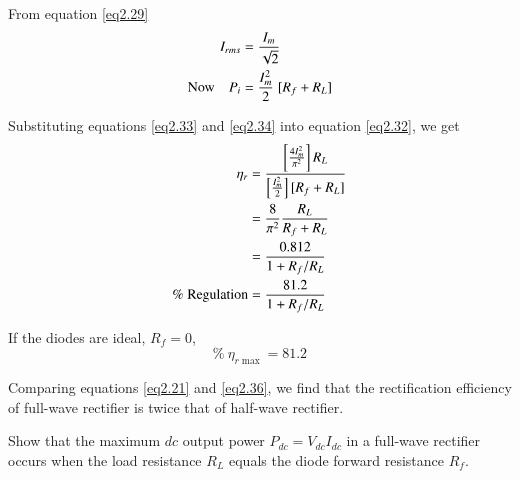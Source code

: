 From equation \eqref{eq2.29}
\begin{align}
I_{rms} & = \frac{I_m}{\sqrt{2}}\notag\\
\text{Now} \quad  P_i & = \frac{I^2_m}{2} \; [R_f + R_L] \label{eq2.34}
\end{align}

Substituting equations \eqref{eq2.33} and \eqref{eq2.34} into equation
\eqref{eq2.32}, we get
\begin{align}
\eta_r & = \frac{\left[\frac{4 I^2_m}{\pi^2} \right]
  R_L}{\left[\frac{I^2_m}{2} \right] [R_f + R_L]} \notag\\
& = \frac{8}{\pi^2} \frac{R_L}{R_f + R_L} \notag\\
& = \frac{0.812}{1 + R_f / R_L} \notag\\
\% ~ \text{Regulation} & = \frac{81.2}{1+ R_f / R_L} \label{eq2.35}
\end{align} 

If the diodes are ideal, $R_f = 0$,
\begin{equation}
\% ~ \eta_{r \max} = 81.2 \label{eq2.36}
\end{equation}

\medskip
{}
Comparing equations \eqref{eq2.21} and \eqref{eq2.36}, we find that
the rectification efficiency of full-wave rectifier is twice that of
half-wave rectifier.

\begin{example}\label{exam2.5}
Show that the maximum $dc$ output power $P_{dc} = V_{dc} I_{dc}$ in  a
full-wave rectifier occurs when the load resistance $R_L$ equals the
diode forward resistance $R_f$.
\end{example}


